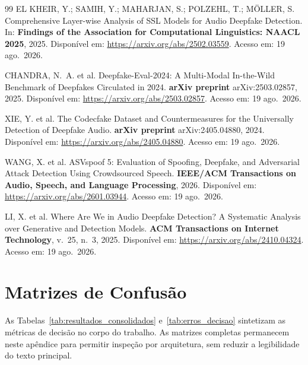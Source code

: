 \documentclass[12pt,a4paper]{article}
\begin{document}
\begin{thebibliography}{99}
	EL KHEIR, Y.; SAMIH, Y.; MAHARJAN, S.; POLZEHL, T.; MÖLLER, S.
	Comprehensive Layer-wise Analysis of SSL Models for Audio Deepfake Detection.
	In: \textbf{Findings of the Association for Computational Linguistics: NAACL
		2025}, 2025.
	Disponível em: \url{https://arxiv.org/abs/2502.03559}.
	Acesso em: 19 ago.\ 2026.
	
	CHANDRA, N.~A. et al.
	Deepfake-Eval-2024: A Multi-Modal In-the-Wild Benchmark of Deepfakes Circulated
	in 2024.
	\textbf{arXiv preprint} arXiv:2503.02857, 2025.
	Disponível em: \url{https://arxiv.org/abs/2503.02857}.
	Acesso em: 19 ago.\ 2026.
	
	XIE, Y. et al.
	The Codecfake Dataset and Countermeasures for the Universally Detection of
	Deepfake Audio.
	\textbf{arXiv preprint} arXiv:2405.04880, 2024.
	Disponível em: \url{https://arxiv.org/abs/2405.04880}.
	Acesso em: 19 ago.\ 2026.
	
	WANG, X. et al.
	ASVspoof 5: Evaluation of Spoofing, Deepfake, and Adversarial Attack Detection
	Using Crowdsourced Speech.
	\textbf{IEEE/ACM Transactions on Audio, Speech, and Language Processing}, 2026.
	Disponível em: \url{https://arxiv.org/abs/2601.03944}.
	Acesso em: 19 ago.\ 2026.
	
	LI, X. et al.
	Where Are We in Audio Deepfake Detection? A Systematic Analysis over Generative
	and Detection Models.
	\textbf{ACM Transactions on Internet Technology},
	v.~25, n.~3, 2025.
	Disponível em: \url{https://arxiv.org/abs/2410.04324}.
	Acesso em: 19 ago.\ 2026.
	
\end{thebibliography}
\endgroup

\clearpage
\appendix

\section{Matrizes de Confusão}
\label{ap:matrizes_confusao}

As Tabelas~\ref{tab:resultados_consolidados} e~\ref{tab:erros_decisao}
sintetizam as métricas de decisão no corpo do trabalho. As matrizes completas
permanecem neste apêndice para permitir inspeção por arquitetura, sem reduzir a
legibilidade do texto principal.
\end{document}
